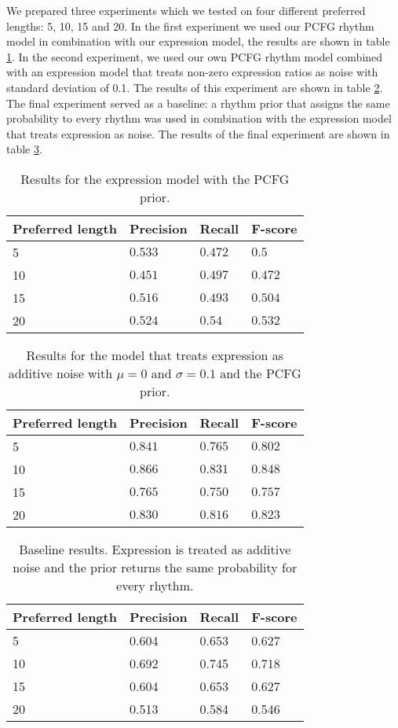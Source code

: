 We prepared three experiments which we tested on four different preferred lengths: 5, 10, 15 and 20. In the first experiment we used our PCFG rhythm model in combination with our expression model, the results are shown in table \ref{tab:results1}. In the second experiment, we used our own PCFG rhythm model combined with an expression model that treats non-zero expression ratios as noise with standard deviation of 0.1. The results of this experiment are shown in table \ref{tab:results2}. The final experiment served as a baseline: a rhythm prior that assigns the same probability to every rhythm was used in combination with the expression model that treats expression as noise. The results of the final experiment are shown in table \ref{tab:results3}.


\begin{table}
\centering
\caption{Results for the expression model with the PCFG prior.}
\label{tab:results1}
\begin{tabular}{llll}
\hline
\textbf{Preferred length} & \textbf{Precision} & \textbf{Recall} & \textbf{F-score}\\
\hline
\hline
5 & $0.533$ & $0.472$ & $0.5$\\
10 & $0.451$ & $0.497$ & $0.472$\\
15 & $0.516$ & $0.493$ & $0.504$\\
20 & $0.524$ & $0.54$ & $0.532$\\
\hline
\end{tabular}
\end{table}

\begin{table}
\centering
\caption{Results for the model that treats expression as additive noise with $\mu = 0$ and $\sigma = 0.1$ and the PCFG prior.}
\label{tab:results2}
\begin{tabular}{llll}
\hline
\textbf{Preferred length} & \textbf{Precision} & \textbf{Recall} & \textbf{F-score}\\
\hline
\hline
5 & $0.841$ & $0.765$ & $0.802$\\
10 & $0.866$ & $0.831$ & $0.848$\\
15 & $0.765$ & $0.750$ & $0.757$\\
20 & $0.830$ & $0.816$ & $0.823$\\
\hline
\end{tabular}
\end{table}

\begin{table}
\centering
\caption{Baseline results. Expression is treated as additive noise and the prior returns the same probability for every rhythm.}
\label{tab:results3}
\begin{tabular}{llll}
\hline
\textbf{Preferred length} & \textbf{Precision} & \textbf{Recall} & \textbf{F-score}\\
\hline
\hline
5 & 0.604 & 0.653 & 0.627\\
10 & 0.692 & 0.745 & 0.718\\
15 & 0.604 & 0.653 & 0.627\\
20 & 0.513 & 0.584 & 0.546\\
\end{tabular}
\end{table}